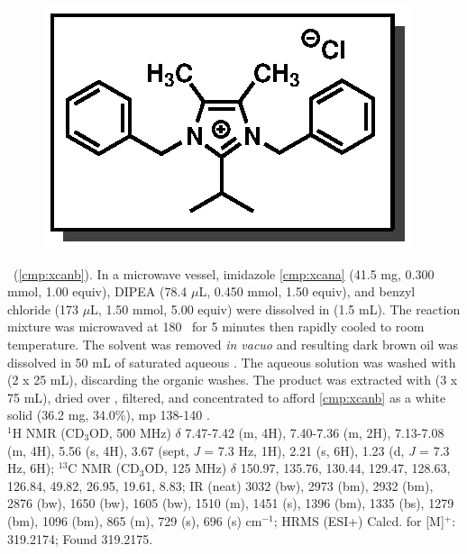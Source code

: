 \pagebreak
\begin{figure}
  \vspace{-15pt}
  \begin{center}
    \includegraphics[scale=0.8]{chp_alkylation/images/xcanb}
  \end{center}
  \vspace{-30pt}
\end{figure}
\noindent \textbf{\CMPxcanb}\ (\ref{cmp:xcanb}). In a microwave vessel, imidazole \ref{cmp:xcana}
(41.5 mg, 0.300 mmol, 1.00 equiv), DIPEA (78.4 $\mu$L, 0.450 mmol, 1.50 equiv), and benzyl chloride (173
$\mu$L, 1.50 mmol, 5.00 equiv) were dissolved in  (1.5 mL). The reaction
mixture was microwaved at 180 \degc\ for 5 minutes then rapidly cooled to room temperature. The
solvent was removed \textit{in vacuo} and resulting dark brown oil was dissolved in 50 mL of
saturated aqueous . The aqueous solution was washed with  (2 x 25 mL),
discarding the organic washes. The product was extracted with  (3 x 75 mL), dried over
, filtered, and concentrated to afford \ref{cmp:xcanb} as a white solid (36.2 mg,
34.0\%), mp 138-140 \degc.\\
$^1$H NMR (CD$_3$OD, 500 MHz) $\delta$ 7.47-7.42 (m, 4H), 7.40-7.36 (m, 2H), 7.13-7.08 (m, 4H),
5.56 (s, 4H), 3.67 (sept, \textit{J} = 7.3 Hz, 1H), 2.21 (s, 6H), 1.23 (d, \textit{J} = 7.3 Hz, 6H);
$^{13}$C NMR (CD$_3$OD, 125 MHz) $\delta$ 150.97, 135.76, 130.44, 129.47, 128.63, 126.84, 49.82,
26.95, 19.61, 8.83; IR (neat) 3032 (bw), 2973 (bm), 2932 (bm), 2876 (bw), 1650 (bw), 1605
(bw), 1510 (m), 1451 (s), 1396 (bm), 1335 (bs), 1279 (bm), 1096 (bm), 865 (m), 729 (s),
696 (s) cm$^{-1}$; HRMS (ESI+) Calcd.
for  [M]$^+$:
319.2174; Found 319.2175.


\pagebreak
